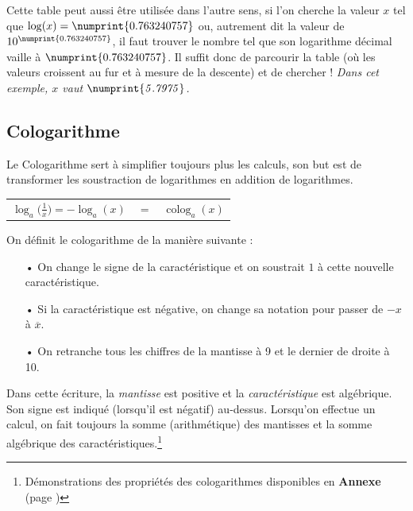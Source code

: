 \documentclass[a4paper, twoside]{article}
\begin{document}
	\vspace{0.3 cm}

	Cette table peut aussi être utilisée dans l'autre sens, si l'on cherche la valeur $x$ tel que $\log(x) = \numprint{0.763 240 757}$ ou, autrement dit la valeur de $10^{\numprint{0.763 240 757}}$, il faut trouver le nombre tel que son logarithme décimal vaille à $\numprint{0.763 240 757}$. Il suffit donc de parcourir la table (où les valeurs croissent au fur et à mesure de la descente) et de chercher ! \textit{Dans cet exemple, $\mathit{x}$ vaut $\mathit{\numprint{5.7975}}$.}

	\vspace{0.2 cm}

	\subsection{Cologarithme}

	Le Cologarithme sert à simplifier toujours plus les calculs, son but est de transformer les soustraction de logarithmes en addition de logarithmes.

	\begin{center}
	\begin{tabular}{ccl}

		$ \log_a \Big( \frac{1}{x} \Big) = - \log_a (x) $ & $ = $ & $\operatorname{colog}_a (x) $ \\
		
	\end{tabular}
	\end{center}

	On définit le cologarithme de la manière suivante :
	\begin{itemize}
		\item[•] On change le signe de la caractéristique et on soustrait $1$ à cette nouvelle caractéristique.
		\item[•] Si la caractéristique est négative, on change sa notation pour passer de $-x$ à $\overline{x}$. 
		\item[•] On retranche tous les chiffres de la mantisse à 9 et le dernier de droite à 10.
	\end{itemize}

	\vspace{2 mm}

	Dans cette écriture, la \textit{mantisse} est positive et la \textit{caractéristique} est algébrique. Son signe est indiqué (lorsqu'il est négatif) au-dessus. Lorsqu'on effectue un calcul, on fait toujours la somme (arithmétique) des mantisses et la somme algébrique des caractéristiques.\footnote{Démonstrations des propriétés des cologarithmes disponibles en \textbf{Annexe} (page \pageref{demo_colog})}
\end{document}
